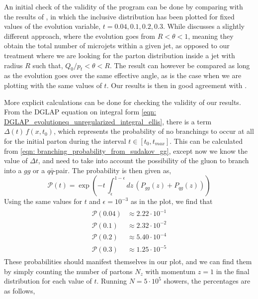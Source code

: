 \documentclass[main.tex]{subfiles}
\begin{document}
An initial check of the validity of the program can be done by comparing with the results of \cite[Figure 2.]{Dasgupta_2015}, in which the inclusive distribution has been plotted for fixed values of the evolution variable, \(t=0.04, 0.1, 0.2, 0.3\). While \cite{Dasgupta_2015} discusses a slightly different approach, where the evolution goes from \(R<\theta<1\), meaning they obtain the total number of microjets within a given jet, as opposed to our treatment where we are looking for the parton distribution inside a jet with radius \(R\) such that, \(Q_0/p_t < \theta < R\). The result can however be compared as long as the evolution goes over the same effective angle, as is the case when we are plotting with the same values of \(t\). Our results is then in good agreement with \cite{Dasgupta_2015}.

More explicit calculations can be done for checking the validity of our results. From the DGLAP equation on integral form \autoref{eqn: DGLAP_evolutioneq_unregularized_integral_ellis}, there is a term \(\Delta(t)\, f(x,t_0)\), which represents the probability of no branchings to occur at all for the initial parton during the interval \(t\in[t_0, t_{max}]\). This can be calculated from \autoref{eqn: branching_probability_from_sudakov_gg}, except now we know the value of \(\Delta t\), and need to take into account the possibility of the gluon to branch into a \(gg\) or a \(q\bar q\)-pair. The probability is then given as,
\begin{equation}
    \mathcal{P}(t) = \exp \left(-t\, \int_{\epsilon}^{1-\epsilon}dz\, (P_{gg}(z) + P_{qg}(z)) \right)
\end{equation}
Using the same values for \(t\) and \(\epsilon=10^{-3}\) as in the plot, we find that 
\begin{align}\label{eqn: no_branching_sudakov_probability}
    \begin{split}
        \mathcal{P}(0.04) &\approx 2.22\cdot 10^{-1} \\
        \mathcal{P}(0.1) &\approx 2.32\cdot 10^{-2} \\
        \mathcal{P}(0.2)&\approx 5.40\cdot 10^{-4} \\
        \mathcal{P}(0.3) &\approx 1.25\cdot 10^{-5}
    \end{split}
\end{align}
These probabilities should manifest themselves in our plot, and we can find them by simply counting the number of partons \(N_z\) with momentum \(z=1\) in the final distribution for each value of \(t\). Running \(N=5\cdot 10^{5}\) showers, the percentages are as follows,
\end{document}
